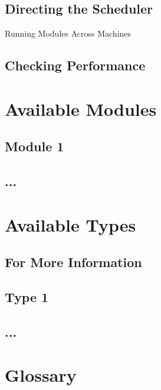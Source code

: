 \section{Directing the Scheduler}
		Running Modules Across Machines


\section{Checking Performance}
	


\appendix
\chapter{Available Modules}


\section{Module 1}


\section{...}




\chapter{Available Types}


\section{For More Information}


\section{Type 1}


\section{...}




\chapter{Glossary}












